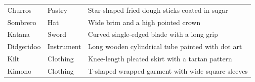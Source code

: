 \begin{table}[p]
\begin{tabular}{@{}p{}p{}p{}@{}}
\raggedright Churros & \raggedright Pastry & \raggedright Star-shaped fried dough sticks coated in sugar\tabularnewline
\raggedright Sombrero & \raggedright Hat & \raggedright Wide brim and a high pointed crown\tabularnewline
\raggedright Katana & \raggedright Sword & \raggedright Curved single-edged blade with a long grip\tabularnewline
\raggedright Didgeridoo & \raggedright Instrument & \raggedright Long wooden cylindrical tube painted with dot art\tabularnewline
\raggedright Kilt & \raggedright Clothing & \raggedright Knee-length pleated skirt with a tartan pattern\tabularnewline
\raggedright Kimono & \raggedright Clothing & \raggedright T-shaped wrapped garment with wide square sleeves\tabularnewline
\bottomrule
\end{tabular}
\end{table}
